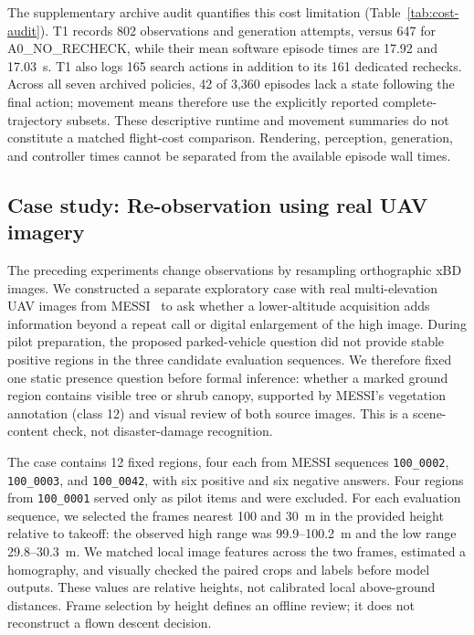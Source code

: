 The supplementary archive audit quantifies this cost limitation (Table~\ref{tab:cost-audit}). T1 records 802 observations and generation attempts, versus 647 for A0\_NO\_RECHECK, while their mean software episode times are 17.92 and 17.03~s. T1 also logs 165 search actions in addition to its 161 dedicated rechecks. Across all seven archived policies, 42 of 3,360 episodes lack a state following the final action; movement means therefore use the explicitly reported complete-trajectory subsets. These descriptive runtime and movement summaries do not constitute a matched flight-cost comparison. Rendering, perception, generation, and controller times cannot be separated from the available episode wall times.



\subsection{Case study: Re-observation using real UAV imagery}
\label{sec:messi-case}
The preceding experiments change observations by resampling orthographic xBD images. We constructed a separate exploratory case with real multi-elevation UAV images from MESSI~\cite{pinkovich2025messi} to ask whether a lower-altitude acquisition adds information beyond a repeat call or digital enlargement of the high image. During pilot preparation, the proposed parked-vehicle question did not provide stable positive regions in the three candidate evaluation sequences. We therefore fixed one static presence question before formal inference: whether a marked ground region contains visible tree or shrub canopy, supported by MESSI's vegetation annotation (class 12) and visual review of both source images. This is a scene-content check, not disaster-damage recognition.

The case contains 12 fixed regions, four each from MESSI sequences \texttt{100\_0002}, \texttt{100\_0003}, and \texttt{100\_0042}, with six positive and six negative answers. Four regions from \texttt{100\_0001} served only as pilot items and were excluded. For each evaluation sequence, we selected the frames nearest 100 and 30~m in the provided height relative to takeoff: the observed high range was 99.9--100.2~m and the low range 29.8--30.3~m. We matched local image features across the two frames, estimated a homography, and visually checked the paired crops and labels before model outputs. These values are relative heights, not calibrated local above-ground distances. Frame selection by height defines an offline review; it does not reconstruct a flown descent decision.

